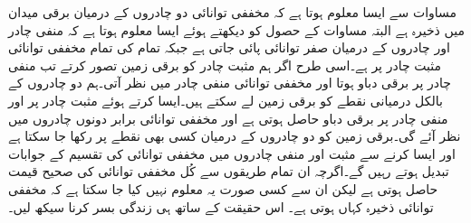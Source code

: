 مساوات  سے ایسا معلوم ہوتا ہے کہ مخففی توانائی دو چادروں کے درمیان برقی میدان میں ذخیرہ ہے البتہ مساوات  کے حصول کو دیکھتے ہوئے  ایسا معلوم ہوتا ہے کہ منفی چادر اور چادروں کے درمیان صفر توانائی پائی جاتی ہے جبکہ تمام کی تمام مخففی توانائی مثبت چادر پر ہے۔اسی طرح اگر ہم مثبت چادر کو برقی زمین تصور کرتے تب منفی چادر پر برقی دباو  ہوتا اور مخففی توانائی منفی چادر میں نظر آتی۔ہم دو چادروں کے بالکل درمیانی نقطے کو برقی زمین لے سکتے ہیں۔ایسا کرتے ہوئے مثبت چادر پر  اور منفی چادر پر  برقی دباو حاصل ہوتی ہے اور مخففی توانائی برابر دونوں چادروں میں نظر آئے گی۔برقی زمین کو دو چادروں کے درمیان کسی بھی نقطے پر رکھا جا سکتا ہے اور ایسا کرنے سے مثبت اور منفی چادروں میں مخففی توانائی کی تقسیم کے  جوابات تبدیل ہوتے رہیں گے۔اگرچہ ان تمام طریقوں سے کُل مخففی توانائی کی صحیح قیمت حاصل ہوتی ہے لیکن ان سے کسی صورت یہ معلوم نہیں کیا جا سکتا ہے کہ مخففی توانائی ذخیرہ کہاں ہوتی ہے۔ اس حقیقت کے ساتھ ہی زندگی بسر کرنا سیکھ لیں۔ 
